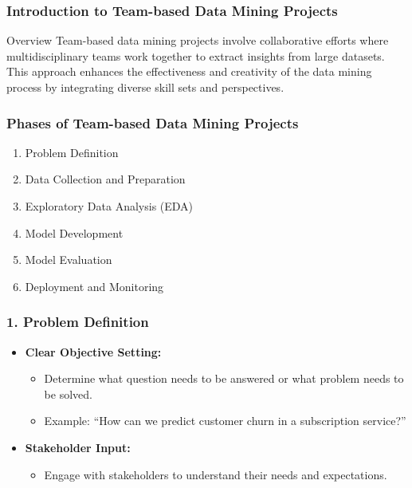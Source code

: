 \documentclass[aspectratio=169]{beamer}
\begin{document}
\frame{\titlepage}

\begin{frame}[fragile]
    \titlepage
\end{frame}

\begin{frame}[fragile]
    \frametitle{Introduction to Team-based Data Mining Projects}
    
    \begin{block}{Overview}
        Team-based data mining projects involve collaborative efforts where multidisciplinary teams work together to extract insights from large datasets. 
        This approach enhances the effectiveness and creativity of the data mining process by integrating diverse skill sets and perspectives.
    \end{block}
\end{frame}

\begin{frame}[fragile]
    \frametitle{Phases of Team-based Data Mining Projects}
    
    \begin{enumerate}
        \item Problem Definition
        \item Data Collection and Preparation
        \item Exploratory Data Analysis (EDA)
        \item Model Development
        \item Model Evaluation
        \item Deployment and Monitoring
    \end{enumerate}
\end{frame}

\begin{frame}[fragile]
    \frametitle{1. Problem Definition}
    
    \begin{itemize}
        \item \textbf{Clear Objective Setting:} 
            \begin{itemize}
                \item Determine what question needs to be answered or what problem needs to be solved.
                \item Example: ``How can we predict customer churn in a subscription service?''
            \end{itemize}
        \item \textbf{Stakeholder Input:} 
            \begin{itemize}
                \item Engage with stakeholders to understand their needs and expectations.
            \end{itemize}
    \end{itemize}
\end{frame}
\end{document}
